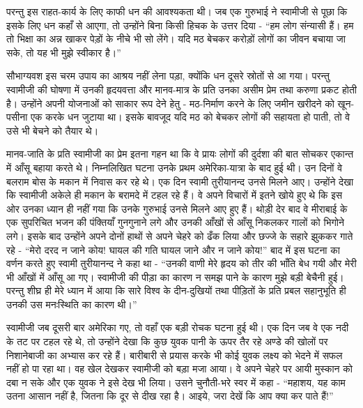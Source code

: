 परन्तु इस राहत-कार्य के लिए काफी धन की आवश्यकता थी। जब एक गुरुभाई ने स्वामीजी से पूछा कि इसके लिए धन कहाँ से आएगा, तो उन्होंने बिना किसी हिचक के उत्तर दिया - “हम लोग संन्यासी हैं। हम तो भिक्षा का अन्न खाकर पेड़ों के नीचे भी सो लेंगे। यदि मठ बेचकर करोड़ों लोगों का जीवन बचाया जा सके, तो यह भी मुझे स्वीकार है।” 

सौभाग्यवश इस चरम उपाय का आश्रय नहीं लेना पड़ा, क्योंकि धन दूसरे स्रोतों से आ गया। परन्तु स्वामीजी की घोषणा में उनकी हृदयवत्ता और मानव-मात्र के प्रति उनका असीम प्रेम तथा करुणा प्रकट होती है। उन्होंने अपनी योजनाओं को साकार रूप देने हेतु - मठ-निर्माण करने के लिए जमीन खरीदने को खून-पसीना एक करके धन जुटाया था। इसके बावजूद यदि मठ को बेचकर लोगों की सहायता हो पाती, तो वे उसे भी बेचने को तैयार थे। 

\vskip -6pt

\delimiter

मानव-जाति के प्रति स्वामीजी का प्रेम इतना गहन था कि वे प्रायः लोगों की दुर्दशा की बात सोचकर एकान्त में आँसू बहाया करते थे। निम्नलिखित घटना उनके प्रथम अमेरिका-यात्रा के बाद हुई थी। उन दिनों वे बलराम बोस के मकान में निवास कर रहे थे। एक दिन स्वामी तुरीयानन्द उनसे मिलने आए। उन्होंने देखा कि स्वामीजी अकेले ही मकान के बरामदे में टहल रहे हैं। वे अपने विचारों में इतने खोये हुए थे कि इस ओर उनका ध्यान ही नहीं गया कि उनके गुरुभाई उनसे मिलने आए हुए हैं। थोड़ी देर बाद वे मीराबाई के एक सुपरिचित भजन की पंक्तियाँ गुनगुनाने लगे और उनकी आँखों से आँसू निकलकर गालों को भिगोने लगे। इसके बाद उन्होंने अपने दोनों हाथों से अपने चेहरे को ढँक लिया और छज्जे के सहारे झुककर गाते रहे - “मेरो दरद न जाने कोय! घायल की गति घायल जाने और न जाने कोय!” बाद में इस घटना का वर्णन करते हुए स्वामी तुरीयानन्द ने कहा था - “उनकी वाणी मेरे हृदय को तीर की भाँति बेध गयी और मेरी भी आँखों में आँसू आ गए। स्वामीजी की पीड़ा का कारण न समझ पाने के कारण मुझे बड़ी बेचैनी हुई। परन्तु शीघ्र ही मेरे ध्यान में आया कि सारे विश्व के दीन-दुखियों तथा पीड़ितों के प्रति प्रबल सहानुभूति ही उनकी उस मनःस्थिति का कारण थी।” 

\delimiter

स्वामीजी जब दूसरी बार अमेरिका गए, तो वहाँ एक बड़ी रोचक घटना हुई थी। एक दिन जब वे एक नदी के तट पर टहल रहे थे, तो उन्होंने देखा कि कुछ युवक पानी के ऊपर तैर रहे अण्डे की खोलों पर निशानेबाजी का अभ्यास कर रहे हैं। बारीबारी से प्रयास करके भी कोई युवक लक्ष्य को भेदने में सफल नहीं हो पा रहा था। वह खेल देखकर स्वामीजी को बड़ा मजा आया। वे अपने चेहरे पर आयी मुस्कान को दबा न सके और एक युवक ने इसे देख भी लिया। उसने चुनौती-भरे स्वर में कहा - “महाशय, यह काम उतना आसान नहीं है, जितना कि दूर से दीख रहा है। आइये, जरा देखें कि आप क्या कर पाते हैं!” 

